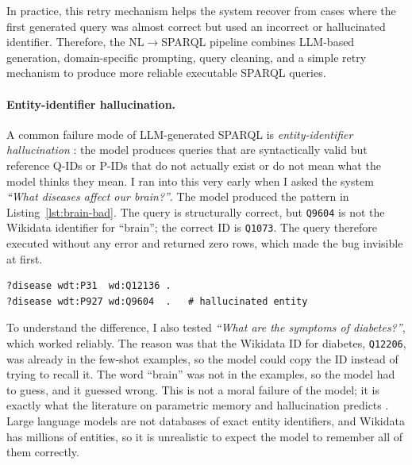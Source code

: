\documentclass[11pt,a4paper]{article}
\begin{document}
In practice, this retry mechanism helps the system recover from cases where the first generated query was almost correct but used an incorrect or hallucinated identifier. Therefore, the NL$\rightarrow$SPARQL pipeline combines LLM-based generation, domain-specific prompting, query cleaning, and a simple retry mechanism to produce more reliable executable SPARQL queries.

\paragraph{Entity-identifier hallucination.}
A common failure mode of LLM-generated SPARQL is
\emph{entity-identifier hallucination} \cite{ji2023hallucination}:
the model produces queries that are syntactically valid but
reference Q-IDs or P-IDs that do not actually exist or do not mean
what the model thinks they mean. I ran into this very early when I
asked the system \emph{``What diseases affect our brain?''}. The
model produced the pattern in Listing~\ref{lst:brain-bad}. The query
is structurally correct, but \texttt{Q9604} is not the Wikidata
identifier for ``brain''; the correct ID is \texttt{Q1073}. The
query therefore executed without any error and returned zero rows,
which made the bug invisible at first.

\begin{lstlisting}[style=sparqlStyle, caption={Hallucinated Q-ID: Q9604 is not the Wikidata identifier for brain (correct ID: Q1073).}, label=lst:brain-bad]
?disease wdt:P31  wd:Q12136 .
?disease wdt:P927 wd:Q9604  .   # hallucinated entity
\end{lstlisting}

To understand the difference, I also tested
\emph{``What are the symptoms of diabetes?''}, which worked
reliably. The reason was that the Wikidata ID for diabetes,
\texttt{Q12206}, was already in the few-shot examples, so the model
could copy the ID instead of trying to recall it. The word ``brain''
was not in the examples, so the model had to guess, and it guessed
wrong. This is not a moral failure of the model; it is exactly what
the literature on parametric memory and hallucination predicts
\cite{ji2023hallucination}. Large language models are not databases
of exact entity identifiers, and Wikidata has millions of entities,
so it is unrealistic to expect the model to remember all of them
correctly.
\end{document}
